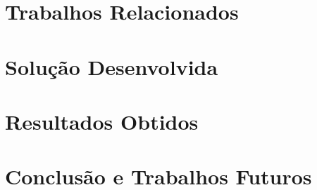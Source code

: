 \documentclass[portuguese,oneside]{tcc}
\begin{document}
\chapter{Trabalhos Relacionados}
\label{cha:trab}


\chapter{Solução Desenvolvida}
\label{cha:implementacao}


\chapter{Resultados Obtidos}
\label{cha:resultados}


\chapter{Conclusão e Trabalhos Futuros}
\label{cha:conclusao}


% 





\end{document}
